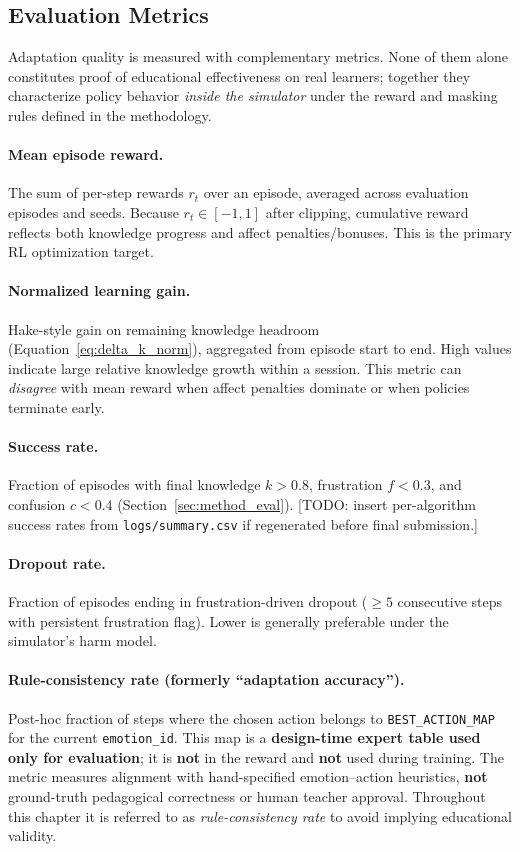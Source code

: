 \subsection{Evaluation Metrics}\label{sec:results_adapt_metrics}

Adaptation quality is measured with complementary metrics. None of them alone constitutes proof of educational effectiveness on real learners; together they characterize policy behavior \emph{inside the simulator} under the reward and masking rules defined in the methodology.

\paragraph{Mean episode reward.} The sum of per-step rewards $r_t$ over an episode, averaged across evaluation episodes and seeds. Because $r_t \in [-1,1]$ after clipping, cumulative reward reflects both knowledge progress and affect penalties/bonuses. This is the primary RL optimization target.

\paragraph{Normalized learning gain.} Hake-style gain on remaining knowledge headroom (Equation~\eqref{eq:delta_k_norm}), aggregated from episode start to end. High values indicate large relative knowledge growth within a session. This metric can \emph{disagree} with mean reward when affect penalties dominate or when policies terminate early.

\paragraph{Success rate.} Fraction of episodes with final knowledge $k>0.8$, frustration $f<0.3$, and confusion $c<0.4$ (Section~\ref{sec:method_eval}). [TODO: insert per-algorithm success rates from \texttt{logs/summary.csv} if regenerated before final submission.]

\paragraph{Dropout rate.} Fraction of episodes ending in frustration-driven dropout ($\geq 5$ consecutive steps with persistent frustration flag). Lower is generally preferable under the simulator's harm model.

\paragraph{Rule-consistency rate (formerly ``adaptation accuracy'').} Post-hoc fraction of steps where the chosen action belongs to \texttt{BEST\_ACTION\_MAP} for the current \texttt{emotion\_id}. This map is a \textbf{design-time expert table used only for evaluation}; it is \textbf{not} in the reward and \textbf{not} used during training. The metric measures alignment with hand-specified emotion--action heuristics, \textbf{not} ground-truth pedagogical correctness or human teacher approval. Throughout this chapter it is referred to as \emph{rule-consistency rate} to avoid implying educational validity.

